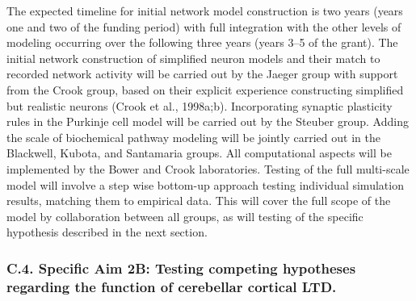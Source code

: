 \documentclass[12pt]{article}
\begin{document}
{The expected timeline for initial network model construction is two years (years one and two of the funding period) with full integration with the other levels of modeling occurring over the following three years (years 3--5 of the grant). The initial network construction of simplified neuron models and their match to recorded network activity will be carried out by the Jaeger group with support from the Crook group, based on their explicit experience constructing simplified but realistic neurons (Crook et al., 1998a;b). Incorporating synaptic plasticity rules in the Purkinje cell model will be carried out by the Steuber group. Adding the scale of biochemical pathway modeling will be jointly carried out in the Blackwell, Kubota, and Santamaria groups. All computational aspects will be implemented by the Bower and Crook laboratories. Testing of the full multi-scale model will involve a step wise bottom-up approach testing individual simulation results, matching them to empirical data. This will cover the full scope of the model by collaboration between all groups, as will testing of the specific hypothesis described in the next section.\\

\subsubsection*{C.4. Specific Aim 2B: Testing competing hypotheses regarding the function of cerebellar cortical LTD.}

}
\end{document}
